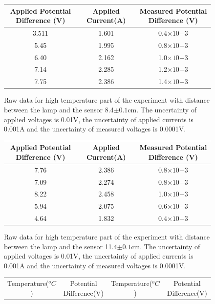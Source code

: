 \documentclass[11pt,a4paper]{article}
\begin{document}
{\begin{center}
\begin{figure} [H]
		\begin{tabular}{|c |c|c|} \hline
			Applied Potential Difference (V)& Applied Current(A) & Measured Potential Difference (V)\\ [0.5ex] 
			\hline
			3.511 & 1.601 & 0.4$\times10{-3}$\\
			\hline
			5.45 & 1.995 & 0.8$\times10{-3}$\\
			\hline
			6.40 & 2.162 & 1.0$\times10{-3}$\\
			\hline
			7.14 & 2.285 & 1.2$\times10{-3}$\\
			\hline
			7.75 & 2.386 & 1.4$\times10{-3}$\\
			\hline
		\end{tabular}
		\caption{Raw data for high temperature part of the experiment with distance between the lamp and the sensor 8.4$\pm0.1$cm. The uncertainty of applied voltages is 0.01V, the uncertainty of applied currents is 0.001A and the uncertainty of measured voltages is 0.0001V.}
	\end{figure}
\end{center}
\begin{center}
	\begin{figure} [H] 
		\begin{tabular}{|c |c|c|} \hline
			Applied Potential Difference (V)& Applied Current(A) & Measured Potential Difference (V)\\ [0.5ex] 
			\hline
			7.76 & 2.386 & 0.8$\times10{-3}$\\
			\hline
			7.09 & 2.274 & 0.8$\times10{-3}$\\
			\hline
			8.22 & 2.458 & 1.0$\times10{-3}$\\
			\hline
			5.94 & 2.075 & 0.6$\times10{-3}$\\
			\hline
			4.64 & 1.832 & 0.4$\times10{-3}$\\
			\hline
		\end{tabular}
		\caption{Raw data for high temperature part of the experiment with distance between the lamp and the sensor 11.4$\pm0.1$cm. The uncertainty of applied voltages is 0.01V, the uncertainty of applied currents is 0.001A and the uncertainty of measured voltages is 0.0001V.}
	\end{figure}
\end{center}
\begin{center}
	\begin{figure} [H] 
		\begin{tabular}{|c |c||c|c|} \hline
		    Temperature($^oC$)& Potential Difference(V) & Temperature($^oC$) & Potential Difference(V)\\ [0.5ex] 

\end{tabular}
\end{figure}
\end{center}}
\end{document}
